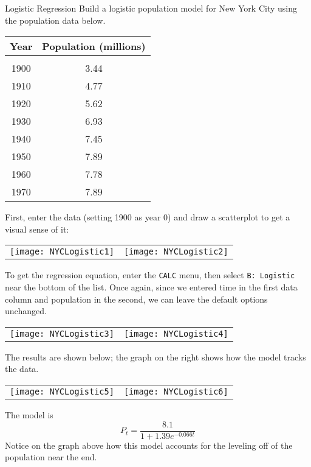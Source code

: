 \begin{example}{Logistic Regression}
Build a logistic population model for New York City using the population data below.
\begin{center}
\begin{tabular}{c c}
\textbf{Year} & \textbf{Population (millions)}\\
\hline
& \\
1900 & 3.44\\
1910 & 4.77\\
1920 & 5.62\\ 
1930 & 6.93\\
1940 & 7.45\\
1950 & 7.89\\
1960 & 7.78\\
1970 & 7.89\\
\end{tabular}
\end{center}

\sol
First, enter the data (setting 1900 as year 0) and draw a scatterplot to get a visual sense of it:
\begin{center}
\begin{tabular}{c c}
\texttt{[image: NYCLogistic1]}
& \texttt{[image: NYCLogistic2]}
\end{tabular}
\end{center}

To get the regression equation, enter the  \texttt{CALC} menu, then select \texttt{B: Logistic} near the bottom of the list.  Once again, since we entered time in the first data column and population in the second, we can leave the default options unchanged.
\begin{center}
\begin{tabular}{c c}
\texttt{[image: NYCLogistic3]}
& \texttt{[image: NYCLogistic4]}
\end{tabular}
\end{center} 

The results are shown below; the graph on the right shows how the model tracks the data.
\begin{center}
\begin{tabular}{c c}
\texttt{[image: NYCLogistic5]}
& \texttt{[image: NYCLogistic6]}
\end{tabular}
\end{center}
The model is \[\boxed{P_t = \dfrac{8.1}{1+1.39e^{-0.066t}}}\]
Notice on the graph above how this model accounts for the leveling off of the population near the end.
\end{example}